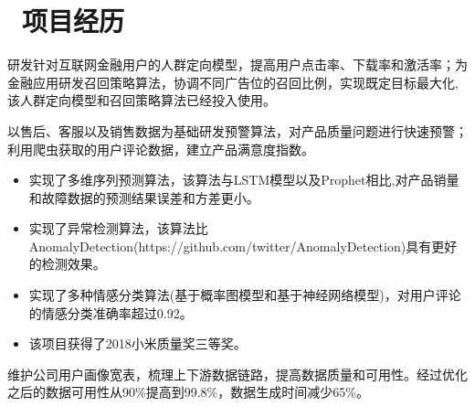 \documentclass{resume}
\begin{document}

\section{\faUsers\ 项目经历}

\begin{onehalfspacing}
研发针对互联网金融用户的人群定向模型，提高用户点击率、下载率和激活率；为金融应用研发召回策略算法，协调不同广告位的召回比例，实现既定目标最大化,该人群定向模型和召回策略算法已经投入使用。
\end{onehalfspacing}


\begin{onehalfspacing}
以售后、客服以及销售数据为基础研发预警算法，对产品质量问题进行快速预警；利用爬虫获取的用户评论数据，建立产品满意度指数。
\begin{itemize}
  \item 实现了多维序列预测算法，该算法与LSTM模型以及Prophet相比,对产品销量和故障数据的预测结果误差和方差更小。
  \item 实现了异常检测算法，该算法比AnomalyDetection(https://github.com/twitter/AnomalyDetection)具有更好的检测效果。
  \item 实现了多种情感分类算法(基于概率图模型和基于神经网络模型)，对用户评论的情感分类准确率超过0.92。
  \item 该项目获得了2018小米质量奖三等奖。
\end{itemize}
\end{onehalfspacing}




\begin{onehalfspacing}
维护公司用户画像宽表，梳理上下游数据链路，提高数据质量和可用性。经过优化之后的数据可用性从90\%提高到99.8\%，数据生成时间减少65\%。
\end{onehalfspacing}
\end{document}
